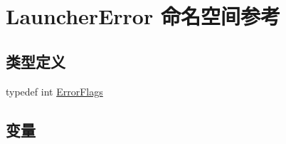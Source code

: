 \hypertarget{namespace_launcher_error}{}\section{Launcher\+Error 命名空间参考}
\label{namespace_launcher_error}
\subsection*{类型定义}
\begin{DoxyCompactItemize}
\item 
typedef int \mbox{\hyperlink{namespace_launcher_error_ac3a8c0329368b890069c60ac80628085}{Error\+Flags}}
\end{DoxyCompactItemize}
\subsection*{变量}

